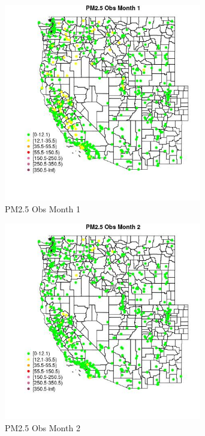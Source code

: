 \begin{figure} 
\centering  
\includegraphics[width=0.77\textwidth]{Code_Outputs/Report_ML_input_PM25_Step4_part_e_de_duplicated_aves_compiled_2019-05-14wNAs_MapObsMo1PM25_Obs.jpg} 
\caption{\label{fig:Report_ML_input_PM25_Step4_part_e_de_duplicated_aves_compiled_2019-05-14wNAsMapObsMo1PM25_Obs}PM2.5 Obs Month 1} 
\end{figure} 
 

\begin{figure} 
\centering  
\includegraphics[width=0.77\textwidth]{Code_Outputs/Report_ML_input_PM25_Step4_part_e_de_duplicated_aves_compiled_2019-05-14wNAs_MapObsMo2PM25_Obs.jpg} 
\caption{\label{fig:Report_ML_input_PM25_Step4_part_e_de_duplicated_aves_compiled_2019-05-14wNAsMapObsMo2PM25_Obs}PM2.5 Obs Month 2} 
\end{figure} 
 

